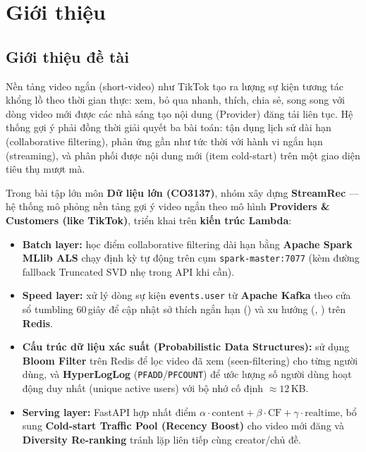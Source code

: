 \chapter{Giới thiệu}

\section{Giới thiệu đề tài}

Nền tảng video ngắn (short-video) như TikTok tạo ra lượng sự kiện tương tác khổng lồ theo thời gian thực: xem, bỏ qua nhanh, thích, chia sẻ, song song với dòng video mới được các nhà sáng tạo nội dung (Provider) đăng tải liên tục. Hệ thống gợi ý phải đồng thời giải quyết ba bài toán: tận dụng lịch sử dài hạn (collaborative filtering), phản ứng gần như tức thời với hành vi ngắn hạn (streaming), và phân phối được nội dung mới (item cold-start) trên một giao diện tiêu thụ mượt mà.

Trong bài tập lớn môn \textbf{Dữ liệu lớn (CO3137)}, nhóm xây dựng \textbf{StreamRec} --- hệ thống mô phỏng nền tảng gợi ý video ngắn theo mô hình \textbf{Providers \& Customers (like TikTok)}, triển khai trên \textbf{kiến trúc Lambda}:

\begin{itemize}
  \item \textbf{Batch layer:} học điểm collaborative filtering dài hạn bằng \textbf{Apache Spark MLlib ALS} chạy định kỳ tự động trên cụm \texttt{spark-master:7077} (kèm đường fallback Truncated SVD nhẹ trong API khi cần).
  \item \textbf{Speed layer:} xử lý dòng sự kiện \texttt{events.user} từ \textbf{Apache Kafka} theo cửa sổ tumbling 60\,giây để cập nhật sở thích ngắn hạn () và xu hướng (, ) trên \textbf{Redis}.
  \item \textbf{Cấu trúc dữ liệu xác suất (Probabilistic Data Structures):} sử dụng \textbf{Bloom Filter} trên Redis để lọc video đã xem (seen-filtering) cho từng người dùng, và \textbf{HyperLogLog} (\texttt{PFADD}\slash\texttt{PFCOUNT}) để ước lượng số người dùng hoạt động duy nhất (unique active users) với bộ nhớ cố định $\approx 12$\,KB.
  \item \textbf{Serving layer:} FastAPI hợp nhất điểm $\alpha\cdot\text{content} + \beta\cdot\text{CF} + \gamma\cdot\text{realtime}$, bổ sung \textbf{Cold-start Traffic Pool (Recency Boost)} cho video mới đăng và \textbf{Diversity Re-ranking} tránh lặp liên tiếp cùng creator/chủ đề.
\end{itemize}

